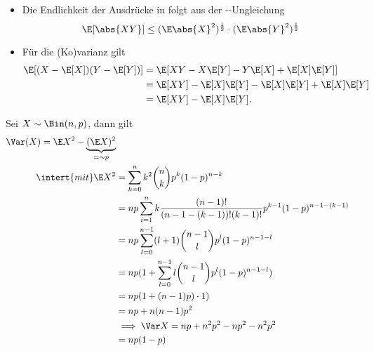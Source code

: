 \begin{*remark}
	\begin{itemize}
		\item Die Endlichkeit der Ausdrücke in  folgt aus der --Ungleichung
		\[
		\E[\abs{XY}] \le (\E\abs{X}^2)^{\frac{1}{2}}\cdot (\E\abs{Y}^2)^{\frac{1}{2}}
		\]
		\item Für die (Ko)varianz gilt
		\begin{align*}
			\E[(X -\E[X])(Y-\E[Y])] &= \E[XY - X\E[Y] - Y\E[X] + \E[X]\E[Y]]\\
			&= \E[XY] - \E[X]\E[Y] - \E[X]\E[Y] + \E[X]\E[Y]\\
			&= \E[XY] - \E[X]\E[Y].
		\end{align*}
	\end{itemize}
\end{*remark}
\begin{example}
	Sei $X\sim\Bin(n,p)$, dann gilt
	\begin{align*}
		\Var(X) = \E X^2 - \underbrace{(\E X)^2}_{=\sim p}\\
		\intert{mit}
		\E X^2 &= \sum_{k=0}^n k^2 \binom{n}{k}p^k (1-p)^{n-k}\\
		&= np \sum_{i=1}^n k \frac{(n-1)!}{(n-1-(k-1))!(k-1)!} p^{k-1}(1-p)^{n-1-(k-1)}\\
		&= np\sum_{l=0}^{n-1}(l+1)\binom{n-1}{l}p^l (1-p)^{n-1-l}\\
		&= np(1 + \sum_{l=0}^{n-1}l \binom{n-1}{l}p^l (1-p)^{n-1-l})\\
		&= np(1+(n-1)p)\cdot 1)\\
		&= np + n(n-1)p^2\\
		&\implies \Var X = np + n^2p^2 - np^2 - n^2p^2\\
		&= np(1-p) 
	\end{align*}
\end{example}